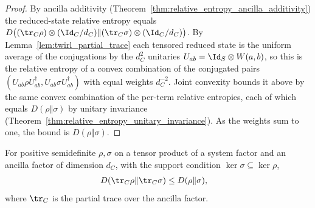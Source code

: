 \begin{proof}\leanok
    By ancilla additivity (Theorem~\ref{thm:relative_entropy_ancilla_additivity})
    the reduced-state relative entropy equals
    $D\bigl((\tr_C\rho)\otimes(\Id_C/d_C)\Vert
        (\tr_C\sigma)\otimes(\Id_C/d_C)\bigr)$. By
    Lemma~\ref{lem:twirl_partial_trace} each tensored reduced state is the uniform
    average of the conjugations by the $d_C^2$ unitaries
    $U_{ab}=\Id_S\otimes W(a,b)$, so this is the relative entropy of a
    convex combination of the conjugated pairs
    $(U_{ab}\rho U_{ab}^\dagger,U_{ab}\sigma U_{ab}^\dagger)$ with equal
    weights $d_C^{-2}$. Joint convexity bounds it above by the same convex
    combination of the per-term relative entropies, each of which equals
    $D(\rho\Vert\sigma)$ by unitary invariance
    (Theorem~\ref{thm:relative_entropy_unitary_invariance}). As the weights sum to
    one, the bound is $D(\rho\Vert\sigma)$.
\end{proof}

\begin{theorem}
    \label{thm:relative_entropy_data_processing_support}
    \leanok
    For positive semidefinite $\rho,\sigma$ on a tensor product of a system factor
    and an ancilla factor of dimension $d_C$, with the support condition
    $\ker\sigma\subseteq\ker\rho$,
    \begin{align}
        D(\tr_C\rho\Vert\tr_C\sigma)
         & \le D(\rho\Vert\sigma),
        \label{eq:entropy_data_processing_support}
    \end{align}
    where $\tr_C$ is the partial trace over the ancilla factor.
\end{theorem}

